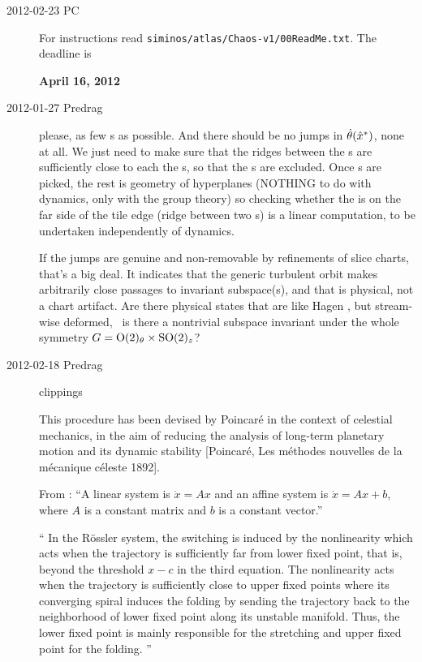 \begin{description}
\item[2012-02-23 PC] For instructions read
\texttt{siminos/atlas/Chaos-v1/00ReadMe.txt}. The deadline is

\textbf{April 16, 2012}

\item[2012-01-27 Predrag]
    please, as few \template s as possible. And there should be no
    jumps in $\dot{\theta}(\hat{x}^\ast)$, none at all. We just need to
    make sure that the ridges between the \template s are sufficiently
    close to each the \template s, so that the {\chartBord s} are excluded. Once
    \template s are picked, the rest is geometry of hyperplanes (NOTHING to
    do with dynamics, only with the group theory) so checking whether the
    {\chartBord} is on the far side of the tile edge (ridge
    between two \slice s) is a linear computation, to be undertaken
    independently of dynamics.

    If the jumps are genuine and non-removable by refinements of slice
    charts, that's a big deal. It indicates that the generic turbulent orbit
    makes arbitrarily close passages to invariant subspace(s), and that is
    physical, not a chart artifact. Are there physical states that are like
    Hagen \eqv, but stream-wise deformed, \ie\ is there a nontrivial subspace
    invariant under the whole symmetry $G = \textrm{O}(2)_\theta \times
    \textrm{SO}(2)_z$?

\item[2012-02-18 Predrag] clippings

This procedure has been devised by Poincar\'e in the context of celestial
mechanics, in the aim of reducing the analysis of long-term planetary
motion and its dynamic stability [Poincar\'e, Les m\'ethodes nouvelles de
la m\'ecanique c\'eleste 1892].

From :
``A linear system is $\dot{x} =Ax$ and an affine system is $\dot{x}
=Ax+b$, where $A$ is a constant matrix and $b$ is a constant vector.''
                                            \toCB

``
In the R\"ossler system, the switching is induced by the nonlinearity
which acts when the trajectory is sufficiently far from lower fixed
point, that is, beyond the threshold $x-c$ in the third equation. The
nonlinearity acts when the trajectory is sufficiently close to upper
fixed points where its converging spiral induces the folding by sending
the trajectory back to the neighborhood of lower fixed point along its
unstable manifold. Thus, the lower fixed point is mainly responsible for
the stretching and upper fixed point for the folding.
''


\end{description}
